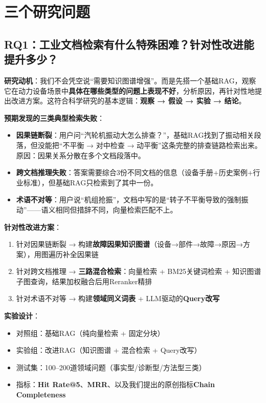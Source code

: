 \documentclass[a4paper, 11pt]{ctexart}
\begin{document}
\section{三个研究问题}

\subsection{RQ1：工业文档检索有什么特殊困难？针对性改进能提升多少？}

\textbf{研究动机}：我们不会凭空说``需要知识图谱增强''。而是先搭一个基础RAG，观察它在动力设备场景中\textbf{具体在哪些类型的问题上表现不好}，分析原因，再针对性地提出改进方案。这符合科学研究的基本逻辑：\textbf{观察 → 假设 → 实验 → 结论}。

\textbf{预期发现的三类典型检索失败}：
\begin{itemize}
    \item \textbf{因果链断裂}：用户问``汽轮机振动大怎么排查？''，基础RAG找到了振动相关段落，但没能把``不平衡 → 对中检查 → 动平衡''这条完整的排查链路检索出来。原因：因果关系分散在多个文档段落中。
    \item \textbf{跨文档推理失败}：答案需要综合3份不同文档的信息（设备手册+历史案例+行业标准），但基础RAG只检索到了其中一份。
    \item \textbf{术语不对等}：用户说``机组抢振''，文档中写的是``转子不平衡导致的强制振动''——语义相同但措辞不同，向量检索匹配不上。
\end{itemize}

\textbf{针对性改进方案}：
\begin{enumerate}
    \item 针对因果链断裂 → 构建\textbf{故障因果知识图谱}（设备→部件→故障→原因→方案），用图遍历补全因果链
    \item 针对跨文档推理 → \textbf{三路混合检索}：向量检索 + BM25关键词检索 + 知识图谱子图查询，结果加权融合后用Reranker精排
    \item 针对术语不对等 → 构建\textbf{领域同义词表} + LLM驱动的\textbf{Query改写}
\end{enumerate}

\textbf{实验设计}：
\begin{itemize}
    \item 对照组：基础RAG（纯向量检索 + 固定分块）
    \item 实验组：改进RAG（知识图谱 + 混合检索 + Query改写）
    \item 测试集：100--200道领域问题（事实型/诊断型/方法型三类）
    \item 指标：\textbf{Hit Rate@5}、\textbf{MRR}、以及我们提出的原创指标\textbf{Chain Completeness}
\end{itemize}
\end{document}
